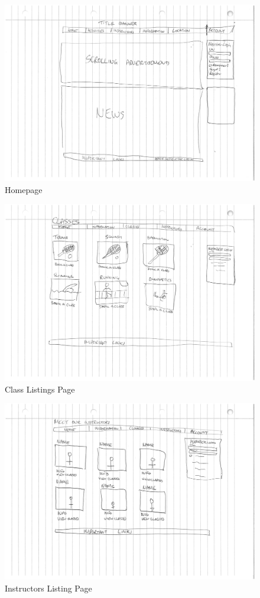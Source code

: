 \documentclass[11pt, article]{article}
\begin{document}
			\begin{figure}[ht!]
	\includegraphics[scale=0.6]{images/homepage}
 	\caption{Homepage}
	\end{figure}

			\begin{figure}[ht!]
	\includegraphics[scale=0.6]{images/classpage}
 	\caption{Class Listings Page}
	\end{figure}	

			\begin{figure}[ht!]
	\includegraphics[scale=0.6]{images/instructorpage}
 	\caption{Instructors Listing Page}
	\end{figure}
\end{document}
